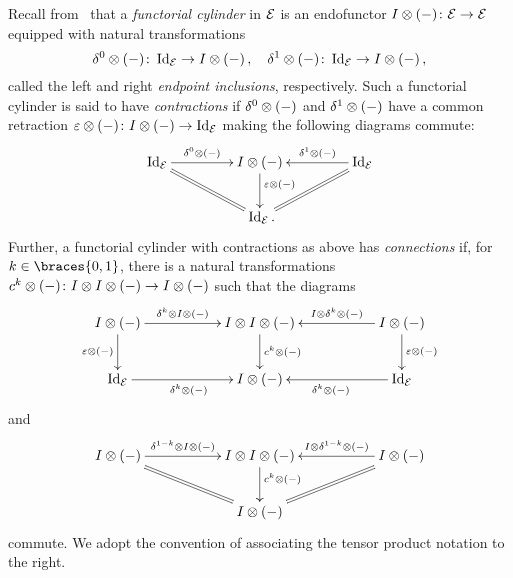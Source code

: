\documentclass[reqno,10pt,a4paper,oneside,draft]{amsart}
\begin{document}
Recall from~\cite{kamps-porter:homotopy} that a \emph{functorial cylinder} in $\mathcal{E}$ is an endofunctor $I \otimes (-) \colon \mathcal{E} \to \mathcal{E}$  equipped with natural transformations 
\[
\delta^0 \otimes (-) \colon   \operatorname{Id}_{\mathcal{E}} \to I \otimes (-) \, , \quad \delta^1 \otimes (-) \colon \operatorname{Id}_{\mathcal{E}} \to I \otimes (-) \, , 
\] 
called the left and right \emph{endpoint inclusions}, respectively. Such a functorial cylinder is said to have \emph{contractions} if $\delta^0 \otimes (-)$ and $\delta^1 \otimes (-)$ have a common retraction $\varepsilon \otimes (-) \colon I \otimes (-) \to \operatorname{Id}_{\mathcal{E}}$ making the following diagrams commute:
\[
\xymatrix@C+2em{
  \Id_\catE
  \ar[r]^-{\lcyl \otimes (-)}
  \ar@{=}[dr]
&
  \interval \otimes (-)
  \ar[d]^(0.4){\ccyl \otimes (-)}
&
  \Id_\catE
  \ar[l]_-{\rcyl \otimes (-)}
  \ar@{=}[dl]
\\&
  \Id_\catE
\rlap{.}}
\]
Further, a functorial cylinder with contractions as above has \emph{connections} if, for $k \in \braces{0, 1}$, there is a natural transformations $c^k \otimes (-) \colon I \otimes I \otimes (-) \to I \otimes (-)$ such that the diagrams
\begin{equation} \label{connections:0}
\begin{gathered}
\xymatrix@C+3em{
  \interval \otimes (-)
  \ar[r]^-{\kcyl \otimes \interval \otimes (-)}
  \ar[d]_{\ccyl \otimes (-)}
&
  \interval \otimes \interval \otimes (-)
  \ar[d]^{c^k \otimes (-)}
&
  \interval \otimes (-)
  \ar[l]_-{\interval \otimes \kcyl \otimes (-)}
  \ar[d]^{\ccyl \otimes (-)}
\\
  \Id_\catE
  \ar[r]_{\kcyl \otimes (-)}
&
  \interval \otimes (-)
&
  \Id_\catE
  \ar[l]^{\kcyl \otimes (-)}
}
\end{gathered}
\end{equation}
and
\begin{equation} \label{connections:1}
\begin{gathered}
\xymatrix@C+3em{
  \interval \otimes (-)
  \ar[r]^-{\kcylinv \otimes \interval \otimes (-)}
  \ar@{=}[dr]
&
  \interval \otimes \interval \otimes (-)
  \ar[d]^(0.4){c^k \otimes (-)}
&
  \interval \otimes (-)
  \ar[l]_-{\interval \otimes \kcylinv \otimes (-)}
  \ar@{=}[dl]
\\&
  \interval \otimes (-)
}
\end{gathered}
\end{equation}
commute. We adopt the convention of associating the tensor product notation to the right.
\end{document}
